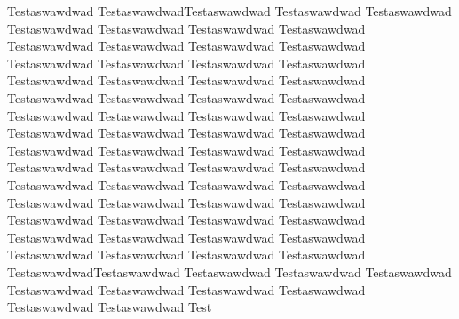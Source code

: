 \documentclass[12pt, twoside, a4paper, hidelinks]{article}
\begin{document}
Testaswawdwad TestaswawdwadTestaswawdwad Testaswawdwad Testaswawdwad Testaswawdwad Testaswawdwad Testaswawdwad Testaswawdwad Testaswawdwad Testaswawdwad Testaswawdwad Testaswawdwad Testaswawdwad Testaswawdwad Testaswawdwad Testaswawdwad Testaswawdwad Testaswawdwad Testaswawdwad Testaswawdwad Testaswawdwad Testaswawdwad Testaswawdwad Testaswawdwad Testaswawdwad Testaswawdwad Testaswawdwad Testaswawdwad Testaswawdwad Testaswawdwad Testaswawdwad Testaswawdwad Testaswawdwad Testaswawdwad Testaswawdwad Testaswawdwad Testaswawdwad Testaswawdwad Testaswawdwad Testaswawdwad Testaswawdwad Testaswawdwad Testaswawdwad Testaswawdwad Testaswawdwad Testaswawdwad Testaswawdwad Testaswawdwad Testaswawdwad Testaswawdwad Testaswawdwad Testaswawdwad Testaswawdwad Testaswawdwad Testaswawdwad Testaswawdwad Testaswawdwad Testaswawdwad Testaswawdwad Testaswawdwad TestaswawdwadTestaswawdwad Testaswawdwad Testaswawdwad Testaswawdwad Testaswawdwad Testaswawdwad Testaswawdwad Testaswawdwad Testaswawdwad Testaswawdwad Test
    
\end{document}
